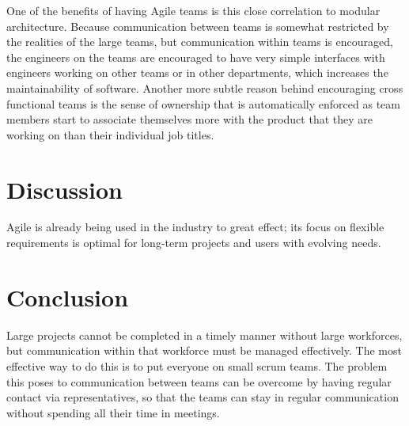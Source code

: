 \documentclass[sigplan,screen]{acmart}
\begin{document}
One of the benefits of having Agile teams is this close correlation to modular architecture. Because communication between teams is somewhat restricted by the realities of the large teams, but communication within teams is encouraged, the engineers on the teams are encouraged to have very simple interfaces with engineers working on other teams or in other departments, which increases the maintainability of software. Another more subtle reason behind encouraging cross functional teams is the sense of ownership that is automatically enforced as team members start to associate themselves more with the product that they are working on than their individual job titles.\cite{David}

\section{Discussion}
Agile is already being used in the industry to great effect; its focus on flexible requirements is optimal for long-term projects and users with evolving needs.


\section{Conclusion}
Large projects cannot be completed in a timely manner without large workforces, but communication within that workforce must be managed effectively. The most effective way to do this is to put everyone on small scrum teams. The problem this poses to communication between teams can be overcome by having regular contact via representatives, so that the teams can stay in regular communication without spending all their time in meetings.





\end{document}
